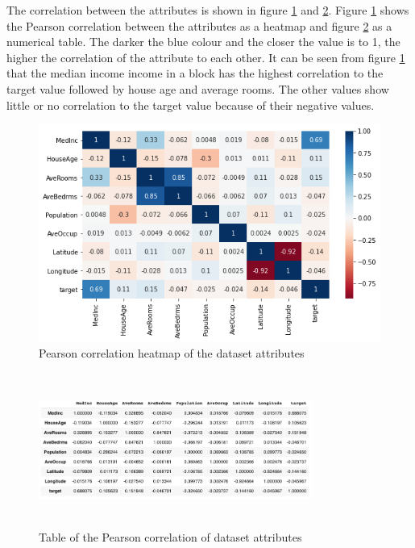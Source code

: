 \documentclass[conference]{IEEEtran}
\begin{document}
The correlation between the attributes is shown in figure \ref{fig:heatmap_correlation} and \ref{fig:Pearson_corr}. Figure \ref{fig:heatmap_correlation} shows the Pearson correlation between the attributes as a heatmap and figure \ref{fig:Pearson_corr} as a numerical table. The darker the blue colour and the closer the value is to 1, the higher the correlation of the attribute to each other. It can be seen from figure \ref{fig:heatmap_correlation} that the median income income in a block has the highest correlation to the target value followed by house age and average rooms. The other values show little or no correlation to the target value because of their negative values.

\begin{figure}[htbp]
	\centerline{\includegraphics [scale=0.5]{figures/heatmap_correlation.png}}
	\caption{Pearson correlation heatmap of the dataset attributes}
	\label{fig:heatmap_correlation}
\end{figure}

\begin{figure}[htbp]
	\centerline{\includegraphics [width=90mm,scale=0.5,height=5cm]{figures/pearson_correlation_of_the_dataset.png}}
	\caption{Table of the Pearson correlation of dataset attributes}
	\label{fig:Pearson_corr}
\end{figure}
\end{document}
